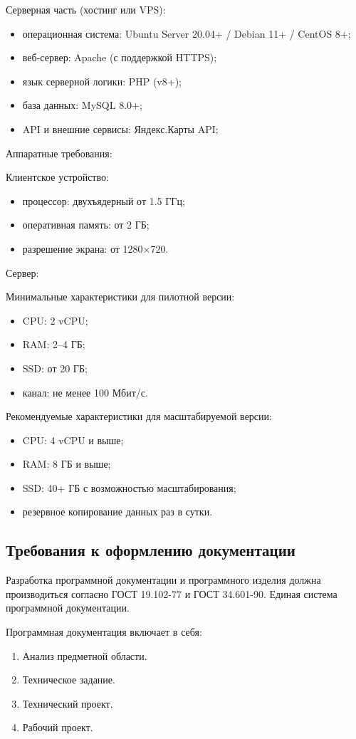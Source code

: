 Серверная часть (хостинг или VPS):
\begin{itemize}
	\item операционная система: Ubuntu Server 20.04+ / Debian 11+ / CentOS 8+;
	\item веб-сервер: Apache (с поддержкой HTTPS);
	\item язык серверной логики: PHP (v8+);
	\item база данных: MySQL 8.0+;
	\item API и внешние сервисы: Яндекс.Карты API\cite{b11};
\end{itemize}

Аппаратные требования:

Клиентское устройство:
\begin{itemize}
	\item процессор: двухъядерный от 1.5 ГГц;
	\item оперативная память: от 2 ГБ;
	\item разрешение экрана: от 1280×720.
\end{itemize}

Сервер:

Минимальные характеристики для пилотной версии:
\begin{itemize}
	\item CPU: 2 vCPU;
	\item RAM: 2–4 ГБ;
	\item SSD: от 20 ГБ;
	\item канал: не менее 100 Мбит/с.
\end{itemize}

Рекомендуемые характеристики для масштабируемой версии:
\begin{itemize}
	\item CPU: 4 vCPU и выше;
	\item RAM: 8 ГБ и выше;
	\item SSD: 40+ ГБ с возможностью масштабирования;
	\item резервное копирование данных раз в сутки.
\end{itemize}

\subsection{Требования к оформлению документации}

Разработка программной документации и программного изделия должна производиться согласно ГОСТ 19.102-77 и ГОСТ 34.601-90. Единая система программной документации.

Программная документация включает в себя:
\begin{enumerate}
	\item Анализ предметной области.
	\item Техническое задание.
	\item Технический проект.
	\item Рабочий проект.
\end{enumerate}
